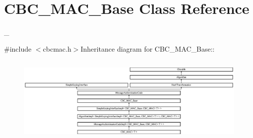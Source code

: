 \hypertarget{class_c_b_c___m_a_c___base}{
\section{CBC\_\-MAC\_\-Base Class Reference}
\label{class_c_b_c___m_a_c___base}
}


\_\-  


{\ttfamily \#include $<$cbcmac.h$>$}Inheritance diagram for CBC\_\-MAC\_\-Base::\begin{figure}[H]
\begin{center}
\leavevmode
\includegraphics[height=4.25676cm]{class_c_b_c___m_a_c___base}
\end{center}
\end{figure}
